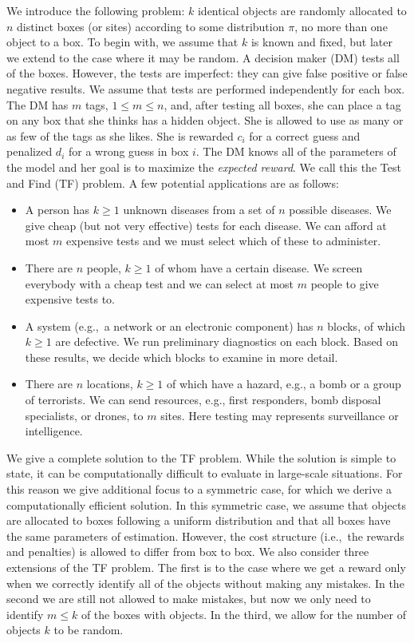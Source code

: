 \documentclass[a4paper,11pt]{article}
\newcommand{\dst}{distribution }
\begin{document}
We introduce the following problem: $k$ identical objects are randomly allocated to $n$ distinct boxes (or sites) according to some \dst $\pi$, no more than one object to a box. To begin with, we assume that $k$ is known and fixed, but later we extend to the case where it may be random. A decision maker (DM) tests all of the boxes. However, the tests are imperfect: they can give false positive or false negative results. We assume that tests are performed independently for each box. The DM has $m$ tags, $1\leq m\leq n$, and, after testing all boxes, she can place a tag on any box that she thinks has a hidden object. She is allowed to use as many or as few of the tags as she likes. She is rewarded $c_i$ for a correct guess and penalized $d_i$ for a wrong guess in box $i$. The DM knows all of the parameters of the model and her goal is to maximize the \emph{expected reward}. We call this the Test and Find (TF) problem. A few potential applications are as follows:
\begin{itemize}
\item A person has $k\ge1$ unknown diseases from a set of $n$ possible diseases. We give cheap (but not very effective) tests for each disease.  We can afford at most $m$ expensive tests and we must select which of these to administer.
\item There are $n$ people, $k\ge 1$ of whom have a certain disease. We screen everybody with a cheap test and we can select at most $m$ people to give expensive tests to.
\item A system (e.g.,\ a network or an electronic component) has $n$ blocks, of which $k\ge1$ are defective. We run preliminary diagnostics on each block. Based on these results, we decide which blocks to examine in more detail.
\item There are $n$ locations, $k\ge1$ of which have a hazard, e.g., a bomb or a group of terrorists. We can send resources, e.g., first responders, bomb disposal specialists, or drones, to $m$ sites. Here testing may represents surveillance or intelligence.
\end{itemize}

We give a complete solution to the TF problem. While the solution is simple to state, it can be computationally difficult to evaluate in large-scale situations. For this reason we give additional focus to a symmetric case, for which we derive a computationally efficient solution. In this symmetric case, we assume that objects are allocated to boxes following a uniform distribution and that all boxes have the same parameters of estimation. However, the cost structure (i.e.,\ the rewards and penalties) is allowed to differ from box to box. We also consider three extensions of the TF problem. The first is to the case where we get a reward only when we correctly identify all of the objects without making any mistakes. In the second we are still not allowed to make mistakes, but now we only need to identify $m\le k$ of the boxes with objects. In the third, we allow for the number of objects $k$ to be random.
\end{document}
